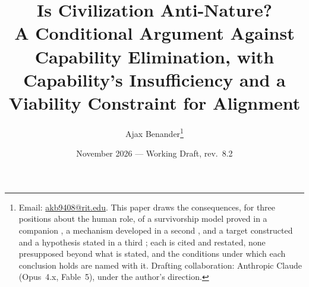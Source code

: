 \DeclareMathOperator{\Leb}{Leb}
\newcommand{\eqd}{\overset{d}{=}}
\newcommand{\one}{\mathbf{1}}
\newcommand{\Imm}{\mathcal{I}}
\newcommand{\Fc}{\mathcal{F}}
\newcommand{\Lc}{\mathcal{L}}
\newcommand{\hm}{\mathfrak{h}}
\newcommand{\Ac}{\mathcal{A}}
\newcommand{\Sc}{\mathsf{S}}
\theoremstyle{plain}
\newtheorem{theorem}{Theorem}[section]
\newtheorem{proposition}[theorem]{Proposition}
\newtheorem{lemma}[theorem]{Lemma}
\newtheorem{corollary}[theorem]{Corollary}
\newtheorem{claim}[theorem]{Claim}
\theoremstyle{definition}
\newtheorem{definition}[theorem]{Definition}
\newtheorem{ansatz}[theorem]{Ansatz}
\newtheorem{convention}[theorem]{Convention}
\newtheorem{constraint}{Constraint}
\newtheorem{principle}{Principle}
\newtheorem{example}[theorem]{Example}
\newtheorem{premise}{Premise}
\newtheorem{objection}[theorem]{Objection}
\renewcommand{\thepremise}{$\Phi$\arabic{premise}}
\theoremstyle{remark}
\newtheorem{remark}[theorem]{Remark}
\title{Is Civilization Anti-Nature?\\ \large A Conditional Argument Against Capability Elimination, with Capability's Insufficiency and a Viability Constraint for Alignment}
\author{Ajax Benander\thanks{Email:
\href{mailto:akb9408@rit.edu}{akb9408@rit.edu}. This paper draws the
consequences, for three positions about the human role, of a survivorship
model proved in a companion \cite{GoldenSurvivorship}, a mechanism developed in a
second \cite{GoldenTechnoanatomy}, and a target constructed and a hypothesis stated in
a third \cite{GoldenRouteWorld}; each is cited and restated, none presupposed
beyond what is stated, and the conditions under which each conclusion
holds are named with it. Drafting collaboration: Anthropic Claude
(Opus~4.x, Fable~5), under the author's direction.}}
\date{November 2026 --- Working Draft, rev.~8.2}

\maketitle

